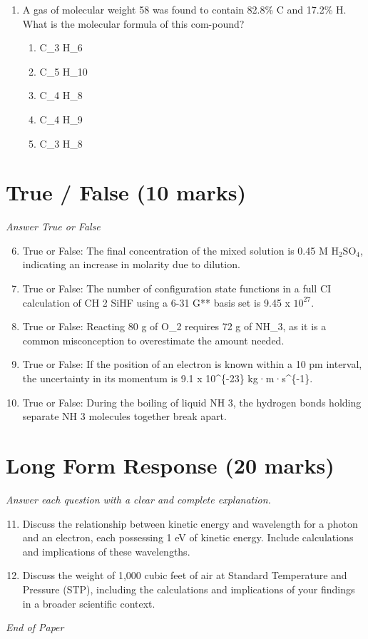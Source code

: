 \documentclass[12pt]{article}
\begin{document}
\begin{enumerate}[label=\arabic*.]
\begin{enumerate}[label=(\alph*)]
    \item 43 minutes
    \item 103 minutes
    \item 93 minutes
    \item 113 minutes
    \item 23 minutes
\end{enumerate}
\item A gas of molecular weight 58 was found to contain 82.8\% C and 17.2\% H. What is the molecular formula of this com-pound?
\begin{enumerate}[label=(\alph*)]
    \item C\_3 H\_6
    \item C\_5 H\_10
    \item C\_4 H\_8
    \item C\_4 H\_9
    \item C\_3 H\_8
\end{enumerate}
\end{enumerate}

\section*{True / False (10 marks)}
\textit{Answer True or False}
\begin{enumerate}[label=\arabic*.]
\setcounter{enumi}{5}
\item True or False: The final concentration of the mixed solution is 0.45 M H$_{2}$SO$_{4}$, indicating an increase in molarity due to dilution.
\item True or False: The number of configuration state functions in a full CI calculation of CH 2 SiHF using a 6-31 G** basis set is 9.45 x $10^27$.
\item True or False: Reacting 80 g of O\_2 requires 72 g of NH\_3, as it is a common misconception to overestimate the amount needed.
\item True or False: If the position of an electron is known within a 10 pm interval, the uncertainty in its momentum is 9.1 x 10^\{-23\} kg·m·s^\{-1\}.
\item True or False: During the boiling of liquid NH 3, the hydrogen bonds holding separate NH 3 molecules together break apart.
\end{enumerate}

\section*{Long Form Response (20 marks)}
\textit{Answer each question with a clear and complete explanation.}
\begin{enumerate}[label=\arabic*.]
\setcounter{enumi}{10}
\item Discuss the relationship between kinetic energy and wavelength for a photon and an electron, each possessing 1 eV of kinetic energy. Include calculations and implications of these wavelengths.
\item Discuss the weight of 1,000 cubic feet of air at Standard Temperature and Pressure (STP), including the calculations and implications of your findings in a broader scientific context.
\end{enumerate}

\vfill
\noindent\textit{End of Paper}
\end{document}
